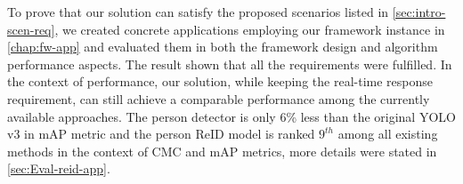 To prove that our solution can satisfy the proposed scenarios listed 
in \autoref{sec:intro-scen-req}, we created concrete applications 
employing our framework instance in \autoref{chap:fw-app} and evaluated them in 
both the framework design and algorithm performance aspects. The result shown that all 
the requirements were fulfilled. In the context of performance, our 
solution, while keeping the real-time response requirement, can still achieve
a comparable performance among the currently available approaches. The person 
detector is only 6\% less than the original YOLO v3 in mAP metric and 
the person ReID model is ranked $9^{th}$ among all existing methods in the 
context of CMC and mAP metrics, more details were stated in
\autoref{sec:Eval-reid-app}.


